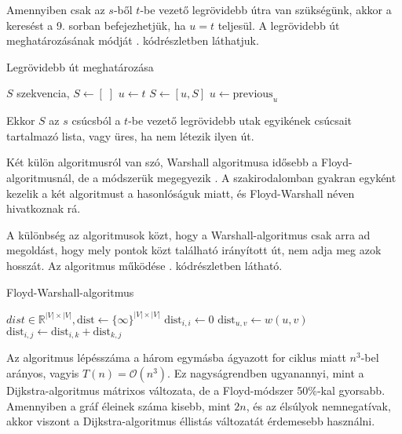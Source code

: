 Amennyiben csak az $s$-ből $t$-be vezető legrövidebb útra van szükségünk, akkor a keresést a 9. sorban befejezhetjük, ha $u = t$ teljesül. A legrövidebb út meghatározásának módját . kódrészletben láthatjuk.

\begin{algorithm}
\caption{Legrövidebb út meghatározása}
\begin{algorithmic}[1]
\STATE $S$ szekvencia, $S \gets [\;]$
\STATE $u \gets t$
    \STATE $S \gets [u, S]$
    \STATE $u \gets \text{previous}_u$
\ENDWHILE
\end{algorithmic}
\label{algo:legrovidebb}
\end{algorithm}

Ekkor $S$ az $s$ csúcsból a $t$-be vezető legrövidebb utak egyikének csúcsait tartalmazó lista, vagy üres, ha nem létezik ilyen út.

\newpage


Két külön algoritmusról van szó, Warshall algoritmusa idősebb a Floyd-algoritmusnál, de a módszerük megegyezik \cite{floyd-warshall}. A szakirodalomban gyakran egyként kezelik a két algoritmust a hasonlóságuk miatt, és Floyd-Warshall néven hivatkoznak rá.

A különbség az algoritmusok közt, hogy a Warshall-algoritmus csak arra ad megoldást, hogy mely pontok közt található irányított út, nem adja meg azok hosszát. Az algoritmus működése . kódrészletben látható.

\begin{algorithm}
\caption{Floyd-Warshall-algoritmus}
\begin{algorithmic}[1]
\STATE $dist \in \mathbb{R}^{|V| \times |V|}, \text{dist} \gets \{\infty\}^{|V| \times |V|}$
    \STATE $\text{dist}_{i, i} \gets 0$
\ENDFOR
{}
    \STATE $\text{dist}_{u, v} \gets w(u, v)$
\ENDFOR
{}
                \STATE $\text{dist}_{i, j} \gets \text{dist}_{i, k} + \text{dist}_{k, j}$
            \ENDIF
        \ENDFOR
    \ENDFOR
\ENDFOR
\end{algorithmic}
\label{algo:floyd-warshall}
\end{algorithm}

Az algoritmus lépésszáma a három egymásba ágyazott for ciklus miatt $n^3$-bel arányos, vagyis $T(n) = \mathcal{O}(n^3)$. Ez nagyságrendben ugyanannyi, mint a Dijkstra-algoritmus mátrixos változata, de a Floyd-módszer 50\%-kal gyorsabb. Amennyiben a gráf éleinek száma kisebb, mint $2n$, és az élsúlyok nemnegatívak, akkor viszont a Dijkstra-algoritmus éllistás változatát érdemesebb használni.

